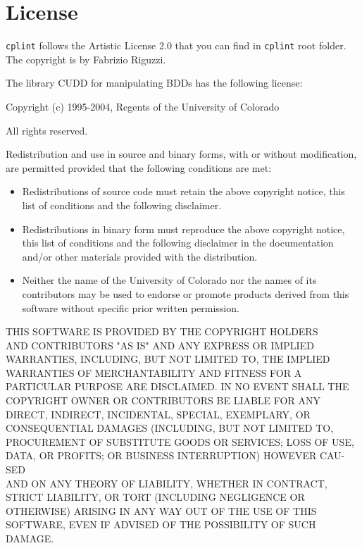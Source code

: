 \documentclass[a4paper,10pt]{article}
\newcommand{\href}[2]{\Link[#1]{}{} #2 \EndLink}
\begin{document}
\section{License}
\label{license}



\texttt{cplint} follows the Artistic License 2.0 that you can find in \texttt{cplint} root folder. The copyright is by Fabrizio Riguzzi.
\vspace{3mm}


The library \href{http://vlsi.colorado.edu/\string ~fabio/}{CUDD} for manipulating BDDs has the following license:

\vspace{3mm}

Copyright (c) 1995-2004, Regents of the University of Colorado

All rights reserved.

Redistribution and use in source and binary forms, with or without
modification, are permitted provided that the following conditions
are met:

\begin{itemize}
\item
Redistributions of source code must retain the above copyright
notice, this list of conditions and the following disclaimer.
\item
Redistributions in binary form must reproduce the above copyright
notice, this list of conditions and the following disclaimer in the
documentation and/or other materials provided with the distribution.
\item
Neither the name of the University of Colorado nor the names of its
contributors may be used to endorse or promote products derived from
this software without specific prior written permission.
\end{itemize}
THIS SOFTWARE IS PROVIDED BY THE COPYRIGHT HOLDERS \\ AND CONTRIBUTORS
"AS IS" AND ANY EXPRESS OR IMPLIED WARRANTIES, INCLUDING, BUT NOT
LIMITED TO, THE IMPLIED WARRANTIES OF MERCHANTABILITY AND FITNESS
FOR A PARTICULAR PURPOSE ARE DISCLAIMED. IN NO EVENT SHALL THE
COPYRIGHT OWNER OR CONTRIBUTORS BE LIABLE FOR ANY DIRECT, INDIRECT,
INCIDENTAL, SPECIAL, EXEMPLARY, OR CONSEQUENTIAL DAMAGES (INCLUDING,
BUT NOT LIMITED TO, PROCUREMENT OF SUBSTITUTE GOODS OR SERVICES;
LOSS OF USE, DATA, OR PROFITS; OR BUSINESS INTERRUPTION) HOWEVER
CAU-SED
\\ AND ON ANY THEORY OF LIABILITY, WHETHER IN CONTRACT, STRICT
LIABILITY, OR TORT (INCLUDING NEGLIGENCE OR OTHERWISE) ARISING IN
ANY WAY OUT OF THE USE OF THIS SOFTWARE, EVEN IF ADVISED OF THE
POSSIBILITY OF SUCH DAMAGE.




\end{document}
